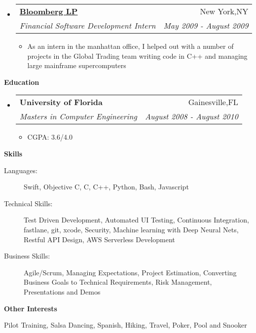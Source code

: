 \documentclass[letterpaper,11pt]{article}
\makeatletter
\newcommand{\resitem}[1]{\item #1 \vspace{-2pt}}
\newcommand{\resheading}[1]{{\large \colorbox{mygrey}{\begin{minipage}{\textwidth}{\textbf{#1 \vphantom{p\^{E}}}}\end{minipage}}}}
\newcommand{\ressubheading}[4]{
\begin{tabular*}{7.0in}{l@{\extracolsep{\fill}}r}
    \textbf{#1} & #2 \\
    \textit{#3} & \textit{#4} \\
\end{tabular*}\vspace{-6pt}}
\makeatother
\begin{document}
\begin{itemize}
\item
    \ressubheading{\href{http://www.bloomberg.com}{Bloomberg LP}}{New York,NY}{Financial Software Development Intern}{May 2009 - August 2009}
    \begin{itemize}
      \resitem{As an intern in the manhattan office, I helped out with a number of projects in the Global Trading team writing code in C++ and managing large mainframe supercomputers}
    \end{itemize}
    
    
\end{itemize}

\vspace{0.3in}
  
\resheading{Education}
\begin{itemize}
\item
    \ressubheading{University of Florida}{Gainesville,FL}{{Masters in Computer Engineering}}{August 2008 - August 2010}
    \begin{itemize}
        \resitem{CGPA: 3.6/4.0}
    \end{itemize}
\end{itemize}

\vspace{0.3in}

\resheading{Skills}
\begin{description}
\item[Languages:]
Swift, Objective C, C, C++, Python, Bash, Javascript
\item[Technical Skills:] Test Driven Development, Automated UI Testing, Continuous Integration, fastlane, git, xcode, Security,
Machine learning with Deep Neural Nets, Restful API Design, AWS Serverless Development
\item[Business Skills:]
Agile/Scrum, Managing Expectations, Project Estimation, Converting Business Goals to Technical Requirements, Risk Management, Presentations and Demos
\end{description}

\vspace{0.2in}

\resheading{Other Interests}
\begin{description}
\item Pilot Training, Salsa Dancing, Spanish, Hiking, Travel, Poker, Pool and Snooker
\end{description}
\end{document}
